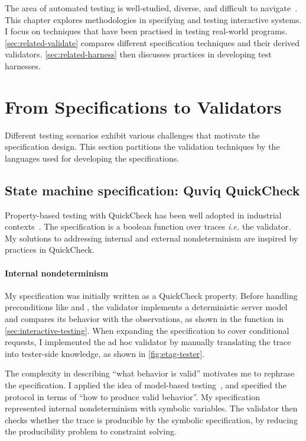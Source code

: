 The area of automated testing is well-studied, diverse, and difficult to
navigate~\cite{anand2013orchestrated}.  This chapter explores methodologies in
specifying and testing interactive systems.  I focus on techniques that have
been practised in testing real-world programs.  \autoref{sec:related-validate}
compares different specification techniques and their derived validators.
\autoref{sec:related-harness} then discusses practices in developing test
harnesses.

\section{From Specifications to Validators}
\label{sec:related-validate}

Different testing scenarios exhibit various challenges that motivate the
specification design.  This section partitions the validation techniques by the
languages used for developing the specifications.

\subsection{State machine specification: Quviq QuickCheck}
Property-based testing with QuickCheck has been well adopted in industrial
contexts~\cite{Hughes2016}.  The specification is a boolean function over traces
{\it i.e.} the validator.  My solutions to addressing internal and external
nondeterminism are inspired by practices in QuickCheck.

\paragraph{Internal nondeterminism}
My \http specification was initially written as a QuickCheck property.  Before
handling preconditions like  and , the
validator implements a deterministic server model and compares its behavior with
the observations, as shown in the  function in
\autoref{sec:interactive-testing}.  When expanding the specification to cover
conditional requests, I implemented the ad hoc validator by manually translating
the trace into tester-side knowledge, as shown in \autoref{fig:etag-tester}.

The complexity in describing ``what behavior is valid'' motivates me to rephrase
the specification.  I applied the idea of model-based
testing~\cite{broy2005model}, and specified the protocol in terms of ``how to
produce valid behavior''.  My specification represented internal nondeterminism
with symbolic variables.  The validator then checks whether the trace is
producible by the symbolic specification, by reducing the producibility problem
to constraint solving.

